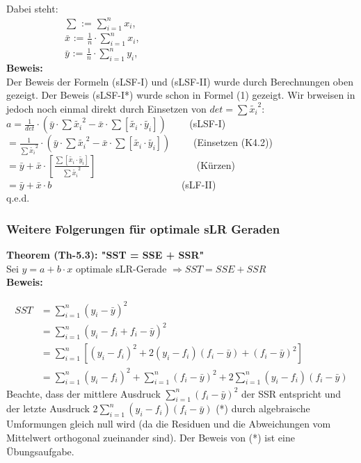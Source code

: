 \documentclass[12pt]{article}
\begin{document}
Dabei steht:\\
$ \quad\quad\quad\quad\quad\quad \sum $  := $ \sum\limits_{i=1}^n x_i $,\\
$ \quad\quad\quad\quad\quad\quad \bar{x} $  := $ \frac{1}{n} \cdot {\sum\limits_{i=1}^n x_i} $, \\
$ \quad\quad\quad\quad\quad\quad \bar{y} $  := $ \frac{1}{n} \cdot {\sum\limits_{i=1}^n y_i} $, \\
\textbf{Beweis:}\\[0.2cm]
%
Der Beweis der Formeln (sLSF-I) und (sLSF-II) wurde durch Berechnungen oben gezeigt. Der Beweis (sLSF-I*) wurde schon in Formel (1) gezeigt. Wir brweisen in jedoch noch einmal direkt durch Einsetzen von $ det = \sum{\widetilde{x_i}}^2 $:\\[0.2cm]
$ a = \frac{1}{det} \cdot (\bar{y} \cdot \sum{\widetilde{x_i}^2} - \bar{x} \cdot  \sum{[\widetilde{x_i} \cdot \widetilde{y_i}]})\qquad $                (sLSF-I) \\[0.2cm] 
$  = \frac{1}{\sum{\widetilde{x_i}}^2} \cdot (\bar{y} \cdot \sum{{\widetilde{x_i}}^2} - \bar{x} \cdot  \sum{[\widetilde{x_i} \cdot \widetilde{y_i}]})\qquad $ (Einsetzen (K4.2))\\[0.2cm]
$ = \bar{y} + \bar{x} \cdot [\frac{\sum{[\widetilde{x_i} \cdot \widetilde{y_i}]}}{\sum{\widetilde{x_i}}^2}] \qquad \qquad \qquad \qquad \qquad $ (Kürzen)\\[0.3cm]
$ = \bar{y} + \bar{x} \cdot b \qquad \qquad\qquad \qquad \qquad \qquad \quad $ (sLF-II)\\    q.e.d.


\subsubsection{Weitere Folgerungen für optimale sLR Geraden}  


\textbf{Theorem (Th-5.3): "SST = SSE + SSR"} \\[0.2cm]
Sei $ y = a + b \cdot x $ optimale sLR-Gerade $ \Longrightarrow SST = SSE + SSR $
\\[0.2cm]
\textbf{Beweis:} 

\begin{align*}
SST &= \sum_{i=1}^{n} (y_i - \bar{y})^2 \\
&= \sum_{i=1}^{n} (y_i - f_i + f_i - \bar{y})^2 \\
&= \sum_{i=1}^{n} [(y_i - f_i)^2 + 2(y_i - f_i)(f_i - \bar{y}) + (f_i - \bar{y})^2] \\
&= \sum_{i=1}^{n} (y_i - f_i)^2 + \sum_{i=1}^{n} (f_i - \bar{y})^2 + 2\sum_{i=1}^{n} (y_i - f_i)(f_i - \bar{y})
\end{align*}
%
Beachte, dass der mittlere Ausdruck $\sum_{i=1}^{n} (f_i - \bar{y})^2$ der SSR entspricht und der letzte Ausdruck $2\sum_{i=1}^{n} (y_i - f_i)(f_i - \bar{y})$ (*) durch algebraische Umformungen gleich null wird (da die Residuen und die Abweichungen vom Mittelwert orthogonal zueinander sind).
Der Beweis von (*) ist eine Übungsaufgabe.
 
\end{document}
